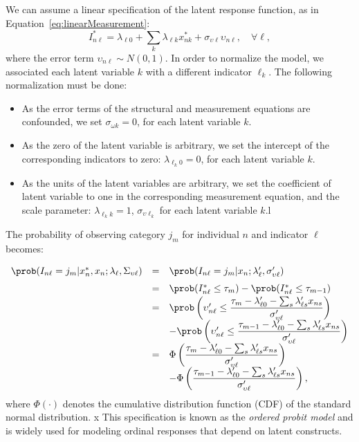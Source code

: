 \documentclass[12pt,a4paper]{article}
\begin{document}
We can assume a linear specification of the latent response function, as in
Equation~\eqref{eq:linearMeasurement}:
\begin{equation}
  \label{eq:measurement_latent}
I^*_{n\ell} = \lambda_{\ell 0}  + \sum_k \lambda_{\ell k}  x_{nk}^* + \sigma_{\upsilon \ell} \upsilon_{n\ell}, \quad \forall \ell,
\end{equation}
where the error term $\upsilon_{n\ell} \sim N(0,1)$.
In order to normalize the model, we associated each latent variable $k$ with a different indicator $\ell_k$.
The following normalization must be done:
\begin{itemize}
\item As the error terms of the structural and measurement equations are confounded, we set $\sigma_{\omega k}=0$, for each latent variable $k$.
\item As the zero of the latent variable is arbitrary, we set the intercept of the corresponding indicators to zero: $\lambda_{\ell_k 0}=0$, for each latent variable $k$.
\item As the units of the latent variables are arbitrary, we set the coefficient of latent variable to one in the corresponding measurement equation, and the scale parameter: $\lambda_{\ell_k k}=1$, $\sigma_{\upsilon \ell_k}$ for each latent variable $k$.l
\end{itemize}
The
probability of observing category $j_m$ for individual $n$ and indicator $\ell$ becomes:
\[
\renewcommand{\arraystretch}{1.5}
\begin{array}{rcl}
\prob(I_{n\ell} = j_m| x^*_n, x_n ; \lambda_\ell, \Sigma_{\upsilon \ell}) &=&\prob(I_{n\ell} = j_m| x_n ; \lambda'_\ell, \sigma'_{\upsilon \ell}) \\&=& \prob(I^*_{n\ell} \leq \tau_m) - \prob(I^*_{n\ell} \leq \tau_{m-1}) \\
&=& \prob\left( \upsilon'_{n\ell} \leq \dfrac{\tau_m -\lambda'_{\ell 0} - \sum_s \lambda'_{\ell s} x_{ns}}{\sigma'_{\upsilon \ell}} \right) \\
& &- \prob\left( \upsilon'_{n\ell} \leq \dfrac{\tau_{m-1} -\lambda'_{\ell 0} - \sum_s \lambda'_{\ell s} x_{ns}}{\sigma'_{\upsilon \ell}} \right) \\
&=& \Phi\left(\dfrac{\tau_m -\lambda'_{\ell 0} - \sum_s \lambda'_{\ell s} x_{ns}}{\sigma'_{\upsilon \ell}} \right) \\
& &- \Phi\left( \dfrac{\tau_{m-1} -\lambda'_{\ell 0} - \sum_s \lambda'_{\ell s} x_{ns}}{\sigma'_{\upsilon \ell}} \right), \\
\end{array}
\]
where $\Phi(\cdot)$ denotes the cumulative distribution function (CDF) of the standard normal distribution.
x
This specification is known as the \emph{ordered probit model} and is
widely used for modeling ordinal responses that depend on latent
constructs.
\end{document}
